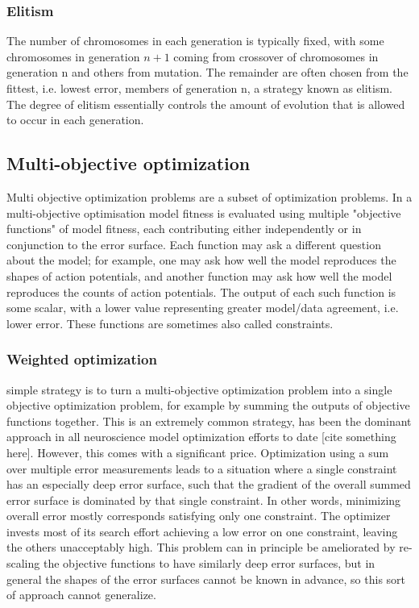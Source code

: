 \subsubsection{Elitism}
The number of chromosomes in each generation is typically fixed, with some chromosomes in generation $n+1$ coming from crossover of chromosomes in generation n and others from mutation.
The remainder are often chosen from the fittest, i.e. lowest error, members of generation n, a strategy known as elitism.
The degree of elitism essentially controls the amount of evolution that is allowed to occur in each generation.

\subsection{Multi-objective optimization} Multi objective optimization problems are a subset of optimization problems.
In a multi-objective optimisation model fitness is evaluated using multiple "objective functions" of model fitness, each contributing either independently or in conjunction to the error surface.
Each function may ask a different question about the model; for example, one may ask how well the model reproduces the shapes of action potentials, and another function may ask how well the model reproduces the counts of action potentials.
The output of each such function is some scalar, with a lower value representing greater model/data agreement, i.e. lower error.
These functions are sometimes also called constraints. 

\subsubsection{Weighted optimization} simple strategy is to turn a multi-objective optimization problem into a single objective optimization problem, for example by summing the outputs of objective functions together. 
This is an extremely common strategy, has been the dominant approach in all neuroscience model optimization efforts to date [cite something here].
However, this comes with a significant price.
Optimization using a sum over multiple error measurements leads to a situation where a single constraint has an especially deep error surface, such that the gradient of the overall summed error surface is dominated by that single constraint.
In other words, minimizing overall error mostly corresponds satisfying only one constraint.
The optimizer invests most of its search effort achieving a low error on one constraint, leaving the others unacceptably high.
This problem can in principle be ameliorated by re-scaling the objective functions to have similarly deep error surfaces, but in general the shapes of the error surfaces cannot be known in advance, so this sort of approach cannot generalize.\\

